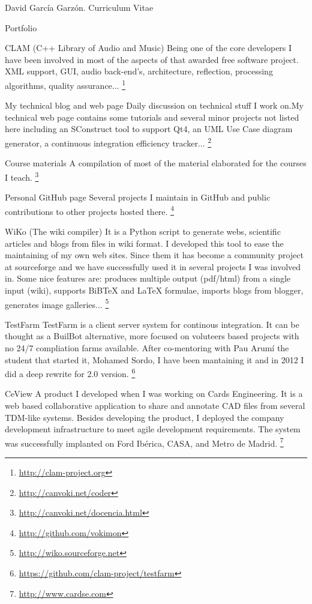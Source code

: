\documentclass{article}
\begin{document}
\begin{cv}{David García Garzón. Curriculum Vitae}
\begin{cvlist}{Portfolio}
\item[CLAM (C++ Library of Audio and Music)]
Being one of the core developers I have been involved in most of the aspects of that awarded free software project. XML support, GUI, audio back-end's, architecture, reflection, processing algorithms, quality assurance...
\footnote{\href{http://clam-project.org}{http://clam-project.org}}
\item[My technical blog and web page]
Daily discussion on technical stuff I work on.My technical web page contains some tutorials and several minor projects not listed here including an SConstruct tool to support Qt4, an UML Use Case diagram generator, a continuous integration efficiency tracker...
\footnote{\href{http://canvoki.net/coder}{http://canvoki.net/coder}}
\item[Course materials]
A compilation of most of the material elaborated for the courses I teach.
\footnote{\href{http://canvoki.net/docencia.html}{http://canvoki.net/docencia.html}}
\item[Personal GitHub page]
Several projects I maintain in GitHub and public contributions to other projects hosted there.
\footnote{\href{http://github.com/vokimon}{http://github.com/vokimon}}
\item[WiKo (The wiki compiler)]
It is a Python script to generate webs, scientific articles and blogs from files in wiki format. I developed this tool to ease the maintaining of my own web sites. Since them it has become a community project at sourceforge and we have successfully used it in several projects I was involved in. Some nice features are: produces multiple output (pdf/html) from a single input (wiki), supports BiBTeX and LaTeX formulae, imports blogs from blogger, generates image galleries... 
\footnote{\href{http://wiko.sourceforge.net}{http://wiko.sourceforge.net}}
\item[TestFarm]
TestFarm is a client server system for continous integration. It can be thought as a BuilBot alternative, more focused on voluteers based projects with no 24/7 compliation farms available. After co-mentoring with Pau Arumí the student that started it, Mohamed Sordo, I have been mantaining it and in 2012 I did a deep rewrite for 2.0 version.
\footnote{\href{https://github.com/clam-project/testfarm}{https://github.com/clam-project/testfarm}}
\item[CeView]
A product I developed when I was working on Cards Engineering. It is a web based collaborative application to share and annotate CAD files from several TDM-like systems. Besides developing the product, I deployed the company development infrastructure to meet agile development requirements. The system was successfully implanted on Ford Ibérica, CASA, and Metro de Madrid. 
\footnote{\href{http://www.cardse.com}{http://www.cardse.com}}

\end{cvlist}


\vspace{2cm}

\end{cv}
\end{document}
